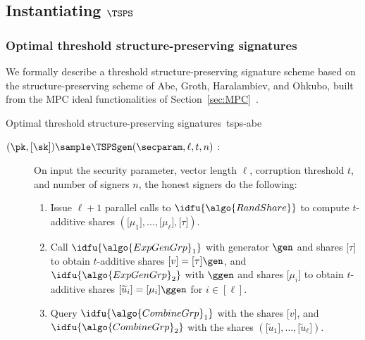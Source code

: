 \subsection{Instantiating $\TSPS$}

\subsubsection{Optimal threshold structure-preserving
signatures}\label{sec:tsps-abe}

We formally describe a threshold structure-preserving signature scheme based on
the structure-preserving scheme of Abe, Groth, Haralambiev, and Ohkubo, built
from the MPC ideal functionalities of Section~\ref{sec:MPC}~\cite{C:AGHO11}.

\begin{protocolbox}{Optimal threshold structure-preserving
  signatures~\cite{C:AGHO11}}{tsps-abe}

  \begin{description}

  \item[$(\pk, \lbrack \sk\rbrack ) \sample \TSPSgen(\secparam, \ell, t, n)$ :]
   On input the security parameter, vector length $\ell$, corruption
    threshold $t$, and number of signers $n$, the honest signers do the
    following:

    \begin{enumerate}

      \item Issue $\ell+1$ parallel calls to $\idfu{\algo{RandShare}}$ to
        compute $t$-additive shares $(\lbrack \mu_1\rbrack , \ldots, \lbrack
        \mu_\ell\rbrack , \lbrack \tau\rbrack )$.

      \item Call $\idfu{\algo{ExpGenGrp}_1}$ with generator $\gen$ and shares
        $\lbrack \tau\rbrack $ to obtain $t$-additive shares $\lbrack
        {v}\rbrack  = {\lbrack \tau\rbrack }\gen$, and
        $\idfu{\algo{ExpGenGrp}_2}$ with $\ggen$ and shares $\lbrack
        \mu_i\rbrack $ to obtain $t$-additive shares $\lbrack
        \widetilde{u}_i\rbrack  = {\lbrack \mu_i\rbrack }\ggen$ for $i \in
        [\ell]$.

      \item Query $\idfu{\algo{CombineGrp}_1}$ with the shares $\lbrack
        {v}\rbrack $, and $\idfu{\algo{CombineGrp}_2}$ with the shares
        $(\lbrack \widetilde{u}_1\rbrack , \ldots, \lbrack
        \widetilde{u}_\ell\rbrack )$.


\end{enumerate}
\end{description}
\end{protocolbox}
